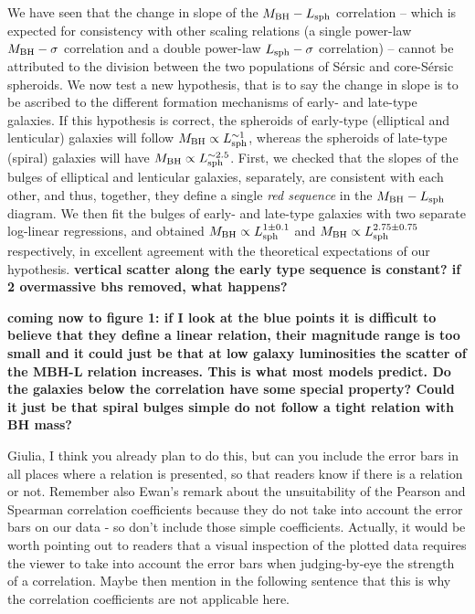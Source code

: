\documentclass[preprint2]{emulateapj}
\begin{document}
We have seen that the change in slope of the $M_{\rm BH} - L_{\rm sph}$ correlation -- 
which is expected for consistency with other scaling relations 
(a single power-law $M_{\rm BH} - \sigma$ correlation and a double power-law $L_{\rm sph} - \sigma$ correlation) -- 
cannot be attributed to the division between the two populations of S\'ersic and core-S\'ersic spheroids.
We now test a new hypothesis, that is to say the change in slope is to be ascribed to the different formation mechanisms of early- and late-type galaxies. 
If this hypothesis is correct, 
the spheroids of early-type (elliptical and lenticular) galaxies will follow $M_{\rm BH} \propto L_{\rm sph}^{\sim 1}$, 
whereas the spheroids of late-type (spiral) galaxies will have $M_{\rm BH} \propto L_{\rm sph}^{\sim 2.5}$.
First, we checked that the slopes of the bulges of elliptical and lenticular galaxies, separately, are consistent with each other, 
and thus, together, they define a single \emph{red sequence} in the $M_{\rm BH} - L_{\rm sph}$ diagram. 
We then fit the bulges of early- and late-type galaxies with two separate log-linear regressions, 
and obtained $M_{\rm BH} \propto L_{\rm sph}^{1 \pm 0.1}$ and $M_{\rm BH} \propto L_{\rm sph}^{2.75 \pm 0.75}$ respectively, 
in excellent agreement with the theoretical expectations of our hypothesis.
{\bf vertical scatter along the early type sequence is constant?
if 2 overmassive bhs removed, what happens?}

{\bf coming now to figure 1: if I look at the blue points it is difficult to believe that they define a linear relation, 
their magnitude range is too small and it could just be that at low galaxy luminosities the scatter of the MBH-L relation increases. 
This is what most models predict. Do the galaxies below the correlation have some special property? 
Could it just be that spiral bulges simple do not follow a tight relation with BH mass? 

Giulia, I think you already plan to do this, but can you include the error bars in all places where a relation is presented, so that readers know if there is a relation or not.
Remember also Ewan's remark about the unsuitability of the Pearson and Spearman correlation coefficients because they do not take into account the error bars on our data - 
so don't include those simple coefficients.  Actually, it would be worth pointing out to readers that a visual inspection of the plotted data requires 
the viewer to take into account the error bars when judging-by-eye the strength of a correlation. 
Maybe then mention in the following sentence that this is why the correlation coefficients are not applicable here. }
\end{document}

